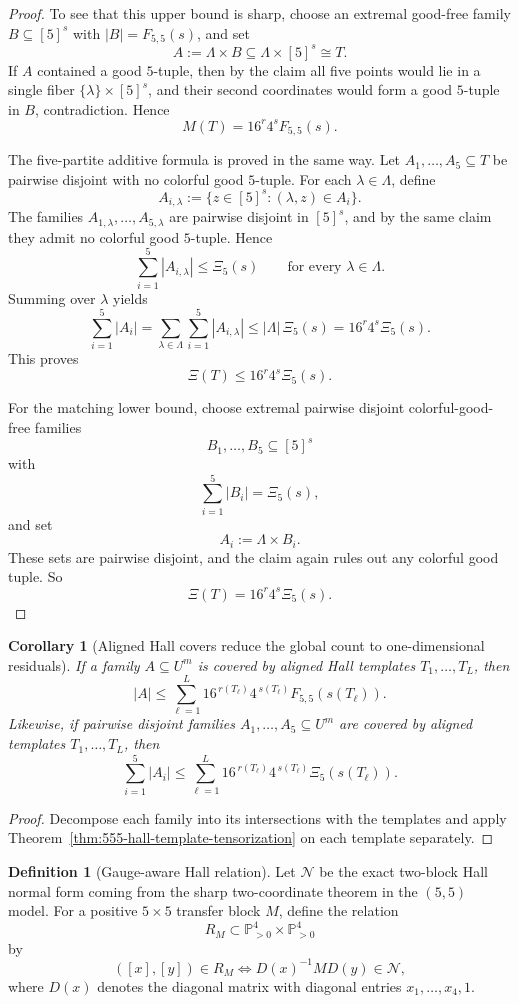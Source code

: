 \documentclass[11pt]{article}
\newtheorem{corollary}[theorem]{Corollary}
\theoremstyle{definition}
\newtheorem{definition}[theorem]{Definition}
\newcommand{\1}{\mathbf{1}}
\begin{document}
\begin{proof}
To see that this upper bound is sharp, choose an extremal good-free family $B\subseteq [5]^s$ with $|B|=F_{5,5}(s)$, and set
\[
A:=\Lambda\times B\subseteq \Lambda\times [5]^s\cong T.
\]
If $A$ contained a good $5$-tuple, then by the claim all five points would lie in a single fiber $\{\lambda\}\times [5]^s$, and their second coordinates would form a good $5$-tuple in $B$, contradiction.
Hence
\[
M(T)=16^r4^sF_{5,5}(s).
\]

The five-partite additive formula is proved in the same way.
Let $A_1,\dots,A_5\subseteq T$ be pairwise disjoint with no colorful good $5$-tuple.
For each $\lambda\in \Lambda$, define
\[
A_{i,\lambda}:=\{z\in [5]^s:(\lambda,z)\in A_i\}.
\]
The families $A_{1,\lambda},\dots,A_{5,\lambda}$ are pairwise disjoint in $[5]^s$, and by the same claim they admit no colorful good $5$-tuple.
Hence
\[
\sum_{i=1}^5 |A_{i,\lambda}|\le \Xi_5(s)
\qquad\text{for every }\lambda\in \Lambda.
\]
Summing over $\lambda$ yields
\[
\sum_{i=1}^5 |A_i|
=
\sum_{\lambda\in \Lambda}\sum_{i=1}^5 |A_{i,\lambda}|
\le
|\Lambda|\,\Xi_5(s)
=
16^r4^s\Xi_5(s).
\]
This proves
\[
\Xi(T)\le 16^r4^s\Xi_5(s).
\]

For the matching lower bound, choose extremal pairwise disjoint colorful-good-free families
\[
B_1,\dots,B_5\subseteq [5]^s
\]
with
\[
\sum_{i=1}^5 |B_i|=\Xi_5(s),
\]
and set
\[
A_i:=\Lambda\times B_i.
\]
These sets are pairwise disjoint, and the claim again rules out any colorful good tuple.
So
\[
\Xi(T)=16^r4^s\Xi_5(s).
\]
\end{proof}

\begin{corollary}[Aligned Hall covers reduce the global count to one-dimensional residuals]\label{cor:555-hall-template-cover}
If a family $A\subseteq U^m$ is covered by aligned Hall templates $T_1,\dots,T_L$, then
\[
|A|
\le
\sum_{\ell=1}^L 16^{\,r(T_\ell)}4^{\,s(T_\ell)}F_{5,5}(s(T_\ell)).
\]
Likewise, if pairwise disjoint families $A_1,\dots,A_5\subseteq U^m$ are covered by aligned templates $T_1,\dots,T_L$, then
\[
\sum_{i=1}^5 |A_i|
\le
\sum_{\ell=1}^L 16^{\,r(T_\ell)}4^{\,s(T_\ell)}\Xi_5(s(T_\ell)).
\]
\end{corollary}

\begin{proof}
Decompose each family into its intersections with the templates and apply Theorem~\ref{thm:555-hall-template-tensorization} on each template separately.
\end{proof}

\begin{definition}[Gauge-aware Hall relation]\label{def:555-gauge-relation}
Let $\mathcal N$ be the exact two-block Hall normal form coming from the sharp two-coordinate theorem in the $(5,5)$ model.
For a positive $5\times 5$ transfer block $M$, define the relation
\[
R_M\subset \mathbb P^4_{>0}\times \mathbb P^4_{>0}
\]
by
\[
([x],[y])\in R_M
\iff
D(x)^{-1}MD(y)\in \mathcal N,
\]
where $D(x)$ denotes the diagonal matrix with diagonal entries $x_1,\dots,x_4,1$.
\end{definition}
\end{document}
